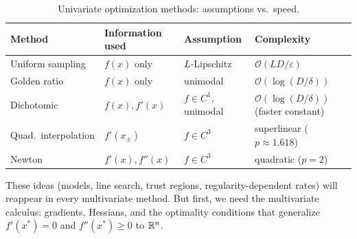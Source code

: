 \begin{table}[ht]
	\centering
	\begin{tabular}{llll}
		\toprule
		Method & Information used & Assumption & Complexity \\
		\midrule
		Uniform sampling & $f(x)$ only   & $L$-Lipschitz & $\mathcal{O}(LD/\varepsilon)$ \\
		Golden ratio     & $f(x)$ only   & unimodal      & $\mathcal{O}(\log(D/\delta))$ \\
		Dichotomic       & $f(x), f'(x)$ & $f \in C^1$, unimodal & $\mathcal{O}(\log(D/\delta))$ (faster constant) \\
		Quad.\ interpolation & $f'(x_\pm)$ & $f \in C^3$   & superlinear ($p \approx 1.618$) \\
		Newton           & $f'(x), f''(x)$ & $f \in C^3$ & quadratic ($p = 2$) \\
		\bottomrule
	\end{tabular}
	\caption{Univariate optimization methods: assumptions vs.\ speed.}
	\label{tab:univariate-methods}
\end{table}

These ideas (models, line search, trust regions, regularity-dependent rates) will reappear in every multivariate method.
But first, we need the multivariate calculus: gradients, Hessians, and the optimality conditions that generalize $f'(x^*) = 0$ and $f''(x^*) \geq 0$ to $\mathbb{R}^n$.